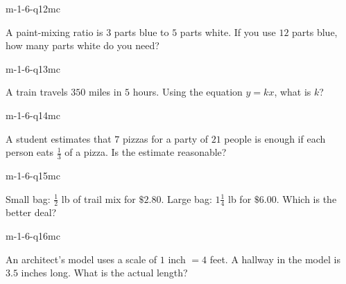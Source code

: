 \begin{practiceQuestion}{m-1-6-q12}{mc}
\begin{questionText}
A paint-mixing ratio is $3$ parts blue to $5$ parts white. If you use $12$ parts blue, how many parts white do you need?
\end{questionText}
\end{practiceQuestion}

\begin{practiceQuestion}{m-1-6-q13}{mc}
\begin{questionText}
A train travels $350$ miles in $5$ hours. Using the equation $y = kx$, what is $k$?
\end{questionText}
\end{practiceQuestion}

\begin{practiceQuestion}{m-1-6-q14}{mc}
\begin{questionText}
A student estimates that $7$ pizzas for a party of $21$ people is enough if each person eats $\frac{1}{3}$ of a pizza. Is the estimate reasonable?
\end{questionText}
\end{practiceQuestion}

\begin{practiceQuestion}{m-1-6-q15}{mc}
\begin{questionText}
Small bag: $\frac{1}{2}$ lb of trail mix for $\$2.80$. Large bag: $1\frac{1}{4}$ lb for $\$6.00$. Which is the better deal?
\end{questionText}
\end{practiceQuestion}

\begin{practiceQuestion}{m-1-6-q16}{mc}
\begin{questionText}
An architect's model uses a scale of $1$ inch $= 4$ feet. A hallway in the model is $3.5$ inches long. What is the actual length?
\end{questionText}
\end{practiceQuestion}

